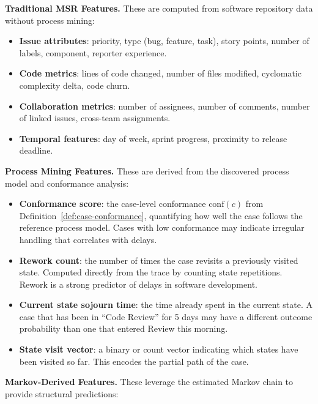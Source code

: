 \textbf{Traditional MSR Features.} These are computed from software
repository data without process mining:

\begin{itemize}
    \item \textbf{Issue attributes}: priority, type (bug, feature, task),
    story points, number of labels, component, reporter experience.
    \item \textbf{Code metrics}: lines of code changed, number of files
    modified, cyclomatic complexity delta, code churn.
    \item \textbf{Collaboration metrics}: number of assignees, number of
    comments, number of linked issues, cross-team assignments.
    \item \textbf{Temporal features}: day of week, sprint progress,
    proximity to release deadline.
\end{itemize}

\textbf{Process Mining Features.} These are derived from the discovered
process model and conformance analysis:

\begin{itemize}
    \item \textbf{Conformance score}: the case-level conformance
    $\text{conf}(c)$ from Definition~\ref{def:case-conformance},
    quantifying how well the case follows the reference process model.
    Cases with low conformance may indicate irregular handling that
    correlates with delays.
    \item \textbf{Rework count}: the number of times the case revisits
    a previously visited state. Computed directly from the trace by
    counting state repetitions. Rework is a strong predictor of delays
    in software development.
    \item \textbf{Current state sojourn time}: the time already spent in
    the current state. A case that has been in ``Code Review'' for 5 days
    may have a different outcome probability than one that entered Review
    this morning.
    \item \textbf{State visit vector}: a binary or count vector indicating
    which states have been visited so far. This encodes the partial path
    of the case.
\end{itemize}

\textbf{Markov-Derived Features.} These leverage the estimated Markov
chain to provide structural predictions:

